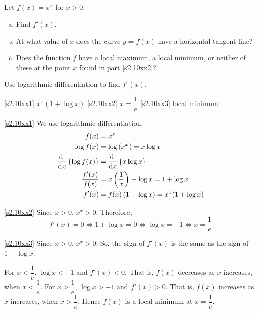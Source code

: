 \subsection*{\Application}
\begin{Mquestion}[1999H]
Let $f(x)=x^x$ for $x>0$.\begin{enumerate}[(a)]
\item\label{s2.10xx1} Find $f'(x)$.
\item\label{s2.10xx2} At what value of $x$ does the curve $y=f(x)$ have a horizontal
tangent line?
\item\label{s2.10xx3} Does the function $f$ have a local maximum, a local minimum,
or neither of these at the point $x$ found in part \eqref{s2.10xx2}?
\end{enumerate}
\end{Mquestion}
\begin{hint} Use logarithmic differentiation to find $f'(x)$.
\end{hint}
\begin{answer}
\eqref{s2.10xx1} $x^x(1+\log x)$
\qquad \eqref{s2.10xx2} $x=\dfrac{1}{e}$
\qquad \eqref{s2.10xx3} local minimum
\end{answer}
\begin{solution}
\eqref{s2.10xx1} We use logarithmic differentiation.
\begin{align*}
f(x)&=x^x\\
\log f(x)&=\log \left(x^x\right)=x\log x\\
\diff{}{x}\left\{\log f(x)\right\}&=\diff{}{x}\left\{x\log x\right\}\\
\frac{f'(x)}{f(x)}&=x\left(\frac{1}{x}\right)+\log x=1+\log x\\
f'(x)&=f(x)\left(1+\log x\right)=x^x(1+\log x)
\end{align*}

\eqref{s2.10xx2} Since $x>0$, $x^x>0$. Therefore,
\[f'(x)=0\iff 1+\log x=0\iff \log x=-1\iff x=\dfrac{1}{e}\]

\eqref{s2.10xx3}
 Since $x>0$, $x^x>0$. So, the sign of $f'(x)$ is the same as the sign of $1+\log x$.

 For $x<\dfrac{1}{e}$, $\log x<-1$ and $f'(x)<0$. That is, $f(x)$
decreases as $x$ increases, when $x<\dfrac{1}{e}$.
For $x>\dfrac{1}{e}$, $\log x>-1$ and $f'(x)>0$.  That is, $f(x)$
increases as $x$ increases, when $x>\dfrac{1}{e}$. Hence $f(x)$
is a {local minimum} at $x=\dfrac{1}{e}$.
\end{solution}


